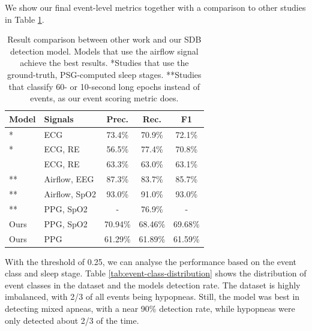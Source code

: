 We show our final event-level metrics together with a comparison to other studies in Table \ref{tab:final-metrics}.

\renewcommand{\arraystretch}{1.5}
\begin{table}
    \centering
    \begin{tabular}{ l l c c c }
        Model & Signals & Prec. & Rec. & F1\\
        \hline
        \cite{olsen2020robust}* & ECG & 73.4\% & 70.9\% & 72.1\% \\
        \cite{xie2023use}* & ECG, RE & 56.5\% & 77.4\% & 70.8\% \\
        \cite{xie2024multi} & ECG, RE & 63.3\% & 63.0\% & 63.1\% \\
        \cite{li2023deep}** & Airflow, EEG & 87.3\% & 83.7\% & 85.7\% \\
        \cite{yook2024deep}** & Airflow, SpO2 & 93.0\% & 91.0\% & 93.0\% \\
        \cite{lazazzera2020detection}** & PPG, SpO2 & - & 76.9\% & - \\
        Ours & PPG, SpO2 & 70.94\% & 68.46\% & 69.68\% \\
        Ours & PPG & 61.29\% & 61.89\% & 61.59\% \\
    \end{tabular}
    \caption{Result comparison between other work and our SDB detection model. Models that use the airflow signal achieve the best results. *Studies that use the ground-truth, PSG-computed sleep stages. **Studies that classify 60- or 10-second long epochs instead of events, as our event scoring metric does. \label{tab:final-metrics}}
\end{table}

With the threshold of 0.25, we can analyse the performance based on the event class and sleep stage. Table \ref{tab:event-class-distribution} shows the distribution of event classes in the dataset and the models detection rate. The dataset is highly imbalanced, with 2/3 of all events being hypopneas. Still, the model was best in detecting mixed apneas, with a near 90\% detection rate, while hypopneas were only detected about 2/3 of the time.

